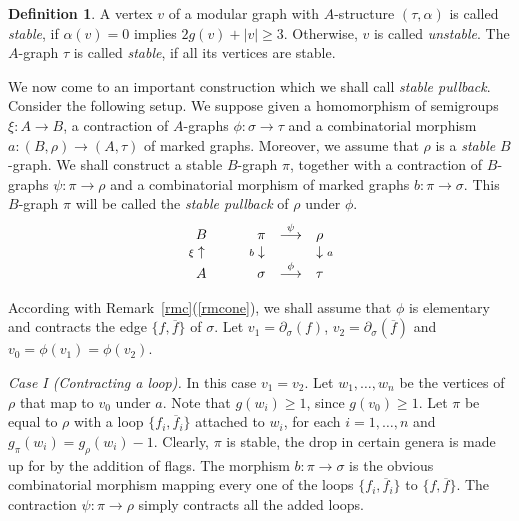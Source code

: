 \documentclass[11pt]{amsart}
\theoremstyle{definition}
\newtheorem{defn}[prop]{Definition}
\theoremstyle{remark}
\newcommand{\del}{\partial}
\newcommand{\ol}{\overline}
\newcommand{\ldiag}[1]
       {\makebox[0cm]{\({\scriptstyle#1}\downarrow\phantom{\scriptstyle#1}\)}}
\newcommand{\ldiagup}[1]
       {\makebox[0cm]{\({\scriptstyle#1}\uparrow\phantom{\scriptstyle#1}\)}}
\newcommand{\rdiag}[1]
       {\makebox[0cm]{\(\phantom{\scriptstyle#1}\downarrow{\scriptstyle#1}\)}}
\newcommand{\s}{_{\sigma}}
\theoremstyle{plain}
\theoremstyle{definition}
\theoremstyle{remark}
\begin{document}
\begin{defn} \label{dosag}
A vertex \(v\) of a modular graph with \(A\)-structure \((\tau,\alpha)\) is called
{\em stable}, if \(\alpha(v)=0\) implies
\(2g(v)+|v|\geq3\). Otherwise, \(v\) is called {\em unstable}. The \(A\)-graph \(\tau\)
is called {\em stable}, if all its
vertices are stable.
\end{defn}

We now come to an important construction which we shall call {\em stable
pullback}. Consider the following setup.  We
suppose given a homomorphism of semigroups \(\xi:A\rightarrow B\), a contraction
of \(A\)-graphs
\(\phi:\sigma\rightarrow\tau\) and a combinatorial morphism
\(a:(B,\rho)\rightarrow(A,\tau)\) of marked graphs.  Moreover,
we assume that \(\rho\) is a {\em stable }\(B\)-graph. We shall construct a stable
\(B\)-graph \(\pi\), together with a
contraction of \(B\)-graphs \(\psi:\pi\rightarrow\rho\) and a combinatorial
morphism of marked graphs
\(b:\pi\rightarrow\sigma\). This \(B\)-graph \(\pi\) will be called the {\em stable
pullback }of \(\rho\) under \(\phi\).
\[
\begin{array}{ccccc}
B & & \pi & \stackrel{\psi}{\longrightarrow} & \rho \\
\ldiagup{\xi} & \phantom{\longrightarrow} & \ldiag{b} &  & \rdiag{a} \\
A & & \sigma & \stackrel{\phi}{\longrightarrow} & \tau
\end{array}
\]

According with Remark~\ref{rmc}(\ref{rmcone}), we shall assume that \(\phi\) is
elementary and contracts the edge
\(\{f,\ol{f}\}\) of \(\sigma\). Let \(v_1=\del\s(f)\), \(v_2=\del\s(\ol{f})\) and
\(v_0=\phi(v_1)=\phi(v_2)\).

{\em Case I (Contracting a loop). } In this case \(v_1=v_2\). Let
\(w_1,\ldots,w_n\) be the vertices of \(\rho\) that map to
\(v_0\) under \(a\). Note that \(g(w_i)\geq1\), since \(g(v_0)\geq1\). Let \(\pi\) be
equal to \(\rho\) with a loop
\(\{f_i,\ol{f}_i\}\) attached to \(w_i\), for each \(i=1,\ldots,n\) and
\(g_\pi(w_i)=g_\rho(w_i)-1\). Clearly, \(\pi\) is stable,
the drop in certain genera is made up for by the addition of flags. The
morphism \(b:\pi\rightarrow\sigma\) is the obvious
combinatorial morphism mapping every one of the loops \(\{f_i,\ol{f}_i\}\) to
\(\{f,\ol{f}\}\). The contraction
\(\psi:\pi\rightarrow\rho\) simply contracts all the added loops.
\end{document}
